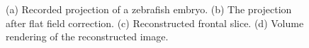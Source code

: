\documentclass[10pt, a4paper]{article}
\begin{document}
\begin{enumerate}
\begin{figure}[!htbp]
\centering
{}
\caption{(a) Recorded projection of a zebrafish embryo. (b) The projection after flat field correction. (c) Reconstructed frontal slice. (d) Volume rendering of the reconstructed image.}
\label{fig::tomography_fish}
\end{figure}


\end{enumerate}
\end{document}
